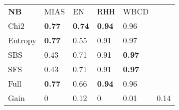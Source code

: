 \begin{tabular}{|l|l|l|l|l|l}
\cline{1-5}
        \textbf{NB} & MIAS              & EN                & RHH               & WBCD      &         \\
\cline{1-5}
Chi2    & \textbf{0.77}  & \textbf{0.74}  & \textbf{0.94}  & 0.96           &         \\
Entropy & \textbf{0.77}  & 0.55           & 0.91           & 0.97           &         \\
SBS     & 0.43           & 0.71           & 0.91           & \textbf{0.97}  &         \\
SFS     & 0.43           & 0.71           & 0.91           & \textbf{0.97}  &         \\
Full    & \textbf{0.77}  & 0.66           & \textbf{0.94}  & 0.96           &         \\
\cline{1-5}
\cline{1-5}
Gain    & 0                 & 0.12           & 0                 & 0.01           & 0.14 \\
\cline{1-5}
\end{tabular}
